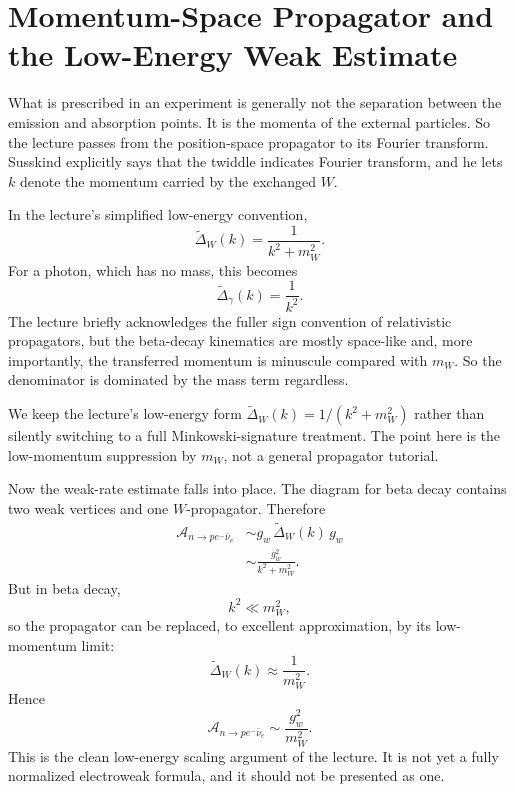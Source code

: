 \section{Momentum-Space Propagator and the Low-Energy Weak Estimate}

What is prescribed in an experiment is generally not the separation between the emission and absorption points. It is the momenta of the external particles. So the lecture passes from the position-space propagator to its Fourier transform. Susskind explicitly says that the twiddle indicates Fourier transform, and he lets \(k\) denote the momentum carried by the exchanged \(W\).

In the lecture's simplified low-energy convention,
\begin{equation}
\widetilde{\Delta}_W(k)=\frac{1}{k^2+m_W^2}.
\end{equation}
For a photon, which has no mass, this becomes
\begin{equation}
\widetilde{\Delta}_\gamma(k)=\frac{1}{k^2}.
\end{equation}
The lecture briefly acknowledges the fuller sign convention of relativistic propagators, but the beta-decay kinematics are mostly space-like and, more importantly, the transferred momentum is minuscule compared with \(m_W\). So the denominator is dominated by the mass term regardless.

\begin{remark}
We keep the lecture's low-energy form \(\widetilde{\Delta}_W(k)=1/(k^2+m_W^2)\) rather than silently switching to a full Minkowski-signature treatment. The point here is the low-momentum suppression by \(m_W\), not a general propagator tutorial.
\end{remark}

Now the weak-rate estimate falls into place. The diagram for beta decay contains two weak vertices and one \(W\)-propagator. Therefore
\begin{align}
\mathcal{A}_{n\to p e^- \bar{\nu}_e}
&\sim g_w\,\widetilde{\Delta}_W(k)\,g_w \\
&\sim \frac{g_w^2}{k^2+m_W^2}.
\end{align}
But in beta decay,
\begin{equation}
k^2 \ll m_W^2,
\end{equation}
so the propagator can be replaced, to excellent approximation, by its low-momentum limit:
\begin{equation}
\widetilde{\Delta}_W(k)\approx \frac{1}{m_W^2}.
\end{equation}
Hence
\begin{equation}
\mathcal{A}_{n\to p e^- \bar{\nu}_e}\sim \frac{g_w^2}{m_W^2}.
\end{equation}
This is the clean low-energy scaling argument of the lecture. It is not yet a fully normalized electroweak formula, and it should not be presented as one.


